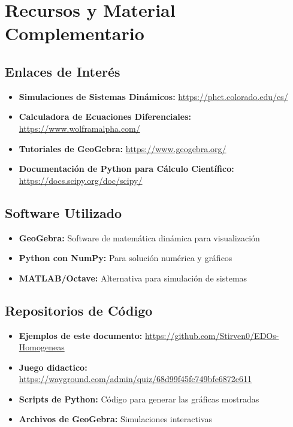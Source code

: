 \newpage
\section{Recursos y Material Complementario}

\subsection{Enlaces de Interés}

\begin{itemize}
    \item \textbf{Simulaciones de Sistemas Dinámicos:} 
    \url{https://phet.colorado.edu/es/}
    
    \item \textbf{Calculadora de Ecuaciones Diferenciales:} 
    \url{https://www.wolframalpha.com/}
    
    \item \textbf{Tutoriales de GeoGebra:} 
    \url{https://www.geogebra.org/}
    
    \item \textbf{Documentación de Python para Cálculo Científico:} 
    \url{https://docs.scipy.org/doc/scipy/}
\end{itemize}

\subsection{Software Utilizado}

\begin{itemize}
    \item \textbf{GeoGebra:} Software de matemática dinámica para visualización
    \item \textbf{Python con NumPy:} Para solución numérica y gráficos
    \item \textbf{MATLAB/Octave:} Alternativa para simulación de sistemas
\end{itemize}

\subsection{Repositorios de Código}

\begin{itemize}
    \item \textbf{Ejemplos de este documento:} 
    \url{https://github.com/Stirven0/EDOs-Homogeneas}
    \item \textbf{Juego didactico:} 
    \url{https://wayground.com/admin/quiz/68d99f45fc749bfe6872e611}
    
    \item \textbf{Scripts de Python:} Código para generar las gráficas mostradas
    \item \textbf{Archivos de GeoGebra:} Simulaciones interactivas
\end{itemize}